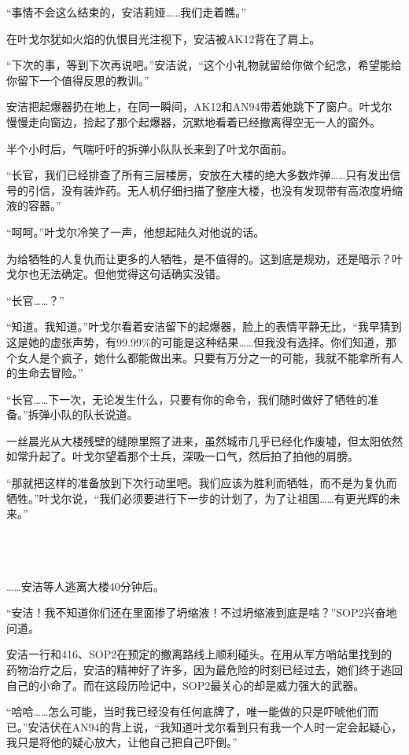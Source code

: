 “事情不会这么结束的，安洁莉娅……我们走着瞧。”

在叶戈尔犹如火焰的仇恨目光注视下，安洁被AK12背在了肩上。

“下次的事，等到下次再说吧。”安洁说，“这个小礼物就留给你做个纪念，希望能给你留下一个值得反思的教训。”

安洁把起爆器扔在地上，在同一瞬间，AK12和AN94带着她跳下了窗户。叶戈尔慢慢走向窗边，捡起了那个起爆器，沉默地看着已经撤离得空无一人的窗外。

半个小时后，气喘吁吁的拆弹小队队长来到了叶戈尔面前。

“长官，我们已经排查了所有三层楼房，安放在大楼的绝大多数炸弹……只有发出信号的引信，没有装炸药。无人机仔细扫描了整座大楼，也没有发现带有高浓度坍缩液的容器。”

“呵呵。”叶戈尔冷笑了一声，他想起陆久对他说的话。

为给牺牲的人复仇而让更多的人牺牲，是不值得的。这到底是规劝，还是暗示？叶戈尔也无法确定。但他觉得这句话确实没错。 

“长官……？”

“知道。我知道。”叶戈尔看着安洁留下的起爆器，脸上的表情平静无比，“我早猜到这是她的虚张声势，有99.99\%的可能是这种结果……但我没有选择。你们知道，那个女人是个疯子，她什么都能做出来。只要有万分之一的可能，我就不能拿所有人的生命去冒险。”

“长官……下一次，无论发生什么，只要有你的命令，我们随时做好了牺牲的准备。”拆弹小队的队长说道。

一丝晨光从大楼残壁的缝隙里照了进来，虽然城市几乎已经化作废墟，但太阳依然如常升起了。叶戈尔望着那个士兵，深吸一口气，然后拍了拍他的肩膀。

“那就把这样的准备放到下次行动里吧。我们应该为胜利而牺牲，而不是为复仇而牺牲。”叶戈尔说，“我们必须要进行下一步的计划了，为了让祖国……有更光辉的未来。”

 \section*{}

……安洁等人逃离大楼40分钟后。

“安洁！我不知道你们还在里面掺了坍缩液！不过坍缩液到底是啥？”SOP2兴奋地问道。

安洁一行和416、SOP2在预定的撤离路线上顺利碰头。在用从军方哨站里找到的药物治疗之后，安洁的精神好了许多，因为最危险的时刻已经过去，她们终于逃回自己的小命了。而在这段历险记中，SOP2最关心的却是威力强大的武器。

“哈哈……怎么可能，当时我已经没有任何底牌了，唯一能做的只是吓唬他们而已。”安洁伏在AN94的背上说，“我知道叶戈尔看到只有我一个人时一定会起疑心，我只是将他的疑心放大，让他自己把自己吓倒。”

